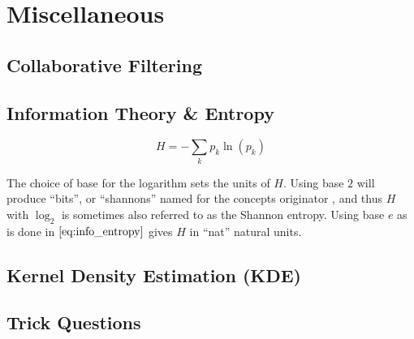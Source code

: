 \chapter{Miscellaneous}
\label{chap:misc}

\section{Collaborative Filtering}
\label{misc:CF}

\section{Information Theory \& Entropy}
\label{misc:info_theory}

\begin{equation} \label{eq:info_entropy}
H = -\sum_{k} p_{k} \ln\left(p_{k}\right)
\end{equation}

The choice of base for the logarithm sets the units of $H$.
Using base $2$ will produce ``bits'', or ``shannons'' named for the concepts originator \cite{shannon1,shannon2},
and thus $H$ with $\log_{2}$ is sometimes also referred to as the Shannon entropy.
Using base $e$ as is done in $\cref{eq:info_entropy}$ gives $H$ in ``nat'' natural units.

\section{Kernel Density Estimation (KDE)}
\label{misc:KDE}

\section{Trick Questions}
\label{misc:trick}

